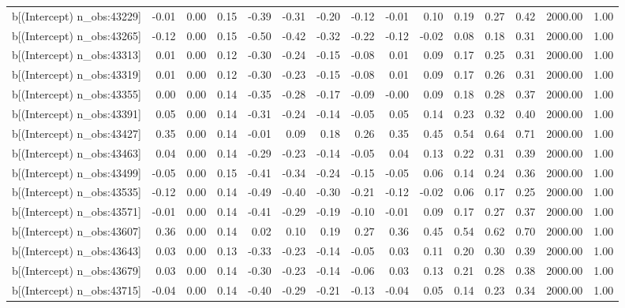 \begin{table}[ht]
\begin{tabular}{rrrrrrrrrrrrrrr}
  b[(Intercept) n\_obs:43229] & -0.01 & 0.00 & 0.15 & -0.39 & -0.31 & -0.20 & -0.12 & -0.01 & 0.10 & 0.19 & 0.27 & 0.42 & 2000.00 & 1.00 \\ 
  b[(Intercept) n\_obs:43265] & -0.12 & 0.00 & 0.15 & -0.50 & -0.42 & -0.32 & -0.22 & -0.12 & -0.02 & 0.08 & 0.18 & 0.31 & 2000.00 & 1.00 \\ 
  b[(Intercept) n\_obs:43313] & 0.01 & 0.00 & 0.12 & -0.30 & -0.24 & -0.15 & -0.08 & 0.01 & 0.09 & 0.17 & 0.25 & 0.31 & 2000.00 & 1.00 \\ 
  b[(Intercept) n\_obs:43319] & 0.01 & 0.00 & 0.12 & -0.30 & -0.23 & -0.15 & -0.08 & 0.01 & 0.09 & 0.17 & 0.26 & 0.31 & 2000.00 & 1.00 \\ 
  b[(Intercept) n\_obs:43355] & 0.00 & 0.00 & 0.14 & -0.35 & -0.28 & -0.17 & -0.09 & -0.00 & 0.09 & 0.18 & 0.28 & 0.37 & 2000.00 & 1.00 \\ 
  b[(Intercept) n\_obs:43391] & 0.05 & 0.00 & 0.14 & -0.31 & -0.24 & -0.14 & -0.05 & 0.05 & 0.14 & 0.23 & 0.32 & 0.40 & 2000.00 & 1.00 \\ 
  b[(Intercept) n\_obs:43427] & 0.35 & 0.00 & 0.14 & -0.01 & 0.09 & 0.18 & 0.26 & 0.35 & 0.45 & 0.54 & 0.64 & 0.71 & 2000.00 & 1.00 \\ 
  b[(Intercept) n\_obs:43463] & 0.04 & 0.00 & 0.14 & -0.29 & -0.23 & -0.14 & -0.05 & 0.04 & 0.13 & 0.22 & 0.31 & 0.39 & 2000.00 & 1.00 \\ 
  b[(Intercept) n\_obs:43499] & -0.05 & 0.00 & 0.15 & -0.41 & -0.34 & -0.24 & -0.15 & -0.05 & 0.06 & 0.14 & 0.24 & 0.36 & 2000.00 & 1.00 \\ 
  b[(Intercept) n\_obs:43535] & -0.12 & 0.00 & 0.14 & -0.49 & -0.40 & -0.30 & -0.21 & -0.12 & -0.02 & 0.06 & 0.17 & 0.25 & 2000.00 & 1.00 \\ 
  b[(Intercept) n\_obs:43571] & -0.01 & 0.00 & 0.14 & -0.41 & -0.29 & -0.19 & -0.10 & -0.01 & 0.09 & 0.17 & 0.27 & 0.37 & 2000.00 & 1.00 \\ 
  b[(Intercept) n\_obs:43607] & 0.36 & 0.00 & 0.14 & 0.02 & 0.10 & 0.19 & 0.27 & 0.36 & 0.45 & 0.54 & 0.62 & 0.70 & 2000.00 & 1.00 \\ 
  b[(Intercept) n\_obs:43643] & 0.03 & 0.00 & 0.13 & -0.33 & -0.23 & -0.14 & -0.05 & 0.03 & 0.11 & 0.20 & 0.30 & 0.39 & 2000.00 & 1.00 \\ 
  b[(Intercept) n\_obs:43679] & 0.03 & 0.00 & 0.14 & -0.30 & -0.23 & -0.14 & -0.06 & 0.03 & 0.13 & 0.21 & 0.28 & 0.38 & 2000.00 & 1.00 \\ 
  b[(Intercept) n\_obs:43715] & -0.04 & 0.00 & 0.14 & -0.40 & -0.29 & -0.21 & -0.13 & -0.04 & 0.05 & 0.14 & 0.23 & 0.34 & 2000.00 & 1.00 \\ 

\end{tabular}
\end{table}
